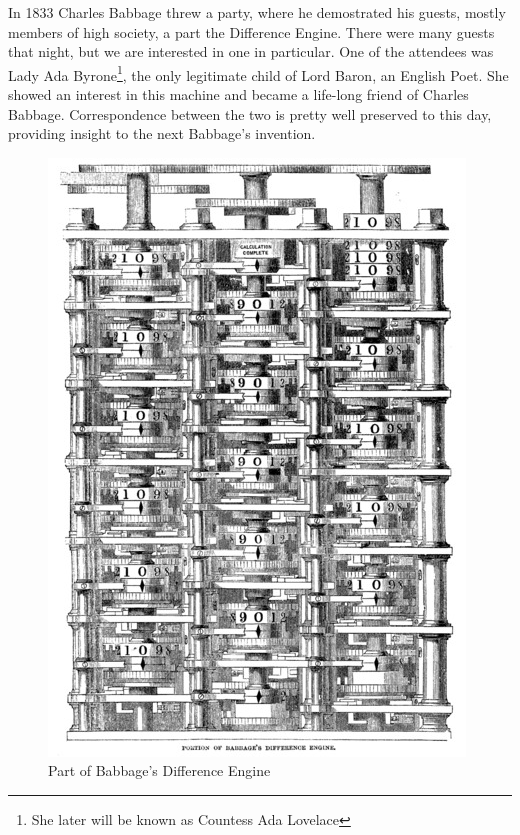 \documentclass{article}
\begin{document}
            In 1833 Charles Babbage threw a party, where he demostrated his guests, mostly members of high society, a part the Difference Engine. There were many
            guests that night, but we are interested in one in particular. One of the attendees was Lady Ada Byrone\footnote{She later will be known as Countess Ada Lovelace},
            the only legitimate child of Lord Baron, an English Poet. She showed an interest in this machine and became a life-long friend of Charles Babbage.
            Correspondence between the two is pretty well preserved to this day, providing insight to the next Babbage's invention. \par

            \begin{figure}
                \centering
                \includegraphics[scale=0.25]{images/devices/device_babbage_difference_engine.jpg}
                \caption{Part of Babbage's Difference Engine}
            \end{figure}
\end{document}
